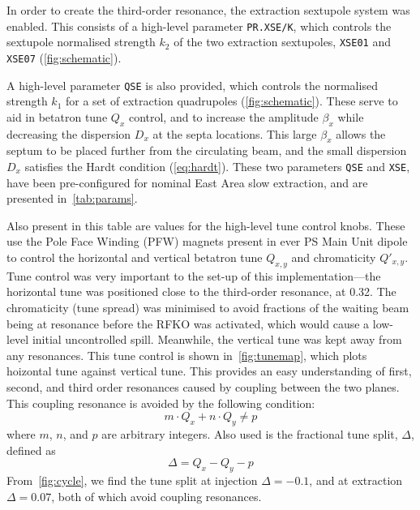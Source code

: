 \documentclass[11pt]{report}
\begin{document}
In order to create the third-order resonance, the extraction sextupole system was enabled. This consists of a high-level parameter \verb|PR.XSE/K|, which controls the sextupole normalised strength $k_2$ of the two extraction sextupoles, \verb|XSE01| and \verb|XSE07| (\autoref{fig:schematic}). 

A high-level parameter \verb|QSE| is also provided, which controls the normalised strength $k_1$ for a set of extraction quadrupoles (\autoref{fig:schematic}). These serve to aid in betatron tune $Q_x$ control, and to increase the amplitude $\beta_x$ while decreasing the dispersion $D_x$ at the septa locations. This large $\beta_x$ allows the septum to be placed further from the circulating beam, and the small dispersion $D_x$ satisfies the Hardt condition (\autoref{eq:hardt}). These two parameters \verb|QSE| and \verb|XSE|, have been pre-configured for nominal East Area slow extraction, and are presented in~\autoref{tab:params}. 

Also present in this table are values for the high-level tune control knobs. These use the Pole Face Winding (PFW) magnets present in ever PS Main Unit dipole to control the horizontal and vertical betatron tune $Q_{x, y}$ and chromaticity $Q'_{x, y}$. Tune control was very important to the set-up of this implementation---the horizontal tune was positioned close to the third-order resonance, at 0.32. The chromaticity (tune spread) was minimised to avoid fractions of the waiting beam being at resonance before the RFKO was activated, which would cause a low-level initial uncontrolled spill. Meanwhile, the vertical tune was kept away from any resonances. This tune control is shown in~\autoref{fig:tunemap}, which plots hoizontal tune against vertical tune. This provides an easy understanding of first, second, and third order resonances caused by coupling between the two planes. This coupling resonance is avoided by the following condition:
\begin{equation}
  m\cdot Q_x+n\cdot Q_y\neq p
\end{equation} where $m$, $n$, and $p$ are arbitrary integers. Also used is the fractional tune split, $\Delta$, defined as
\begin{equation}
  \Delta = Q_x-Q_y-p
\end{equation}
From~\autoref{fig:cycle}, we find the tune split at injection $\Delta=-0.1$, and at extraction $\Delta=0.07$, both of which avoid coupling resonances.
\end{document}
